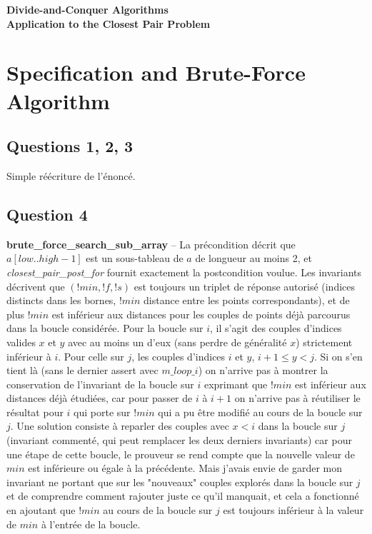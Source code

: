 \documentclass[11pt, openany, titlepage]{article}
\begin{document}
{\center
\LARGE\textbf{Divide-and-Conquer Algorithms\\
Application to the Closest Pair Problem}
}

\vspace{3em}

\section{Specification and Brute-Force Algorithm}

\subsection{Questions 1, 2, 3}

Simple réécriture de l'énoncé.


\subsection{Question 4}

\textbf{brute\_force\_search\_sub\_array}
 -- 
La précondition décrit que ${a[low..high-1]}$ est un sous-tableau de $a$ de longueur au moins 2, et \emph{closest\_pair\_post\_for} fournit exactement la postcondition voulue. Les invariants décrivent que $(!min,!f,!s)$ est toujours un triplet de réponse autorisé (indices distincts dans les bornes, $!min$ distance entre les points correspondants), et de plus $!min$ est inférieur aux distances pour les couples de points déjà parcourus dans la boucle considérée. Pour la boucle sur $i$, il s'agit des couples d'indices valides $x$ et $y$ avec au moins un d'eux (sans perdre de généralité $x$) strictement inférieur à $i$. Pour celle sur $j$, les couples d'indices $i$ et $y$, $i+1\leq y < j$. Si on s'en tient là (sans le dernier assert avec $m\_loop\_i$) on n'arrive pas à montrer la conservation de l'invariant de la boucle sur $i$ exprimant que $!min$ est inférieur aux distances déjà étudiées, car pour passer de $i$ à $i+1$ on n'arrive pas à réutiliser le résultat pour $i$ qui porte sur $!min$ qui a pu être modifié au cours de la boucle sur $j$. Une solution consiste à reparler des couples avec $x<i$ dans la boucle sur $j$ (invariant commenté, qui peut remplacer les deux derniers invariants) car pour une étape de cette boucle, le prouveur se rend compte que la nouvelle valeur de $min$ est inférieure ou égale à la précédente. Mais j'avais envie de garder mon invariant ne portant que sur les "nouveaux" couples explorés dans la boucle sur $j$ et de comprendre comment rajouter juste ce qu'il manquait, et cela a fonctionné en ajoutant que $!min$ au cours de la boucle sur $j$ est toujours inférieur à la valeur de $min$ à l'entrée de la boucle.
\end{document}

